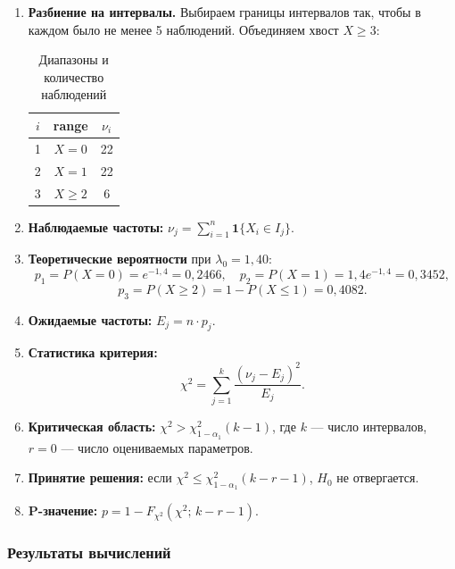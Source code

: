 \documentclass[12pt,a4paper]{article}
\begin{document}
	\begin{enumerate}
		\item \textbf{Разбиение на интервалы.}
		Выбираем границы интервалов так, чтобы в каждом было не менее 5 наблюдений.
		Объединяем хвост $X \ge 3$:
		
		\begin{table}[H]
			\centering
			\begin{tabular}{ccc}
				\toprule
				$i$ & range & $\nu_i$ \\
				\midrule
				1 & $X = 0$   & 22 \\
				2 & $X = 1$   & 22 \\
				3 & $X \ge 2$ &  6 \\
				\bottomrule
			\end{tabular}
			\caption{Диапазоны и количество наблюдений}
		\end{table}
		
		\item \textbf{Наблюдаемые частоты:} $\nu_j = \sum_{i=1}^n \mathbf{1}\{X_i \in I_j\}$.
		
		\item \textbf{Теоретические вероятности} при $\lambda_0 = 1{,}40$:
		\[
		p_1 = P(X=0) = e^{-1{,}4} = 0{,}2466,\quad
		p_2 = P(X=1) = 1{,}4e^{-1{,}4} = 0{,}3452,
		\]
		\[
		p_3 = P(X\ge2) = 1 - P(X\le1) = 0{,}4082.
		\]
		
		\item \textbf{Ожидаемые частоты:} $E_j = n\cdot p_j$.
		
		\item \textbf{Статистика критерия:}
		\[
		\chi^2 = \sum_{j=1}^k \frac{(\nu_j - E_j)^2}{E_j}.
		\]
		
		\item \textbf{Критическая область:} $\chi^2 > \chi^2_{1-\alpha_1}(k-1)$,
		где $k$ --- число интервалов, $r=0$ --- число оцениваемых параметров.
		
		\item \textbf{Принятие решения:} если $\chi^2 \le \chi^2_{1-\alpha_1}(k-r-1)$,
		$H_0$ не отвергается.
		
		\item \textbf{P-значение:} $p = 1 - F_{\chi^2}(\chi^2;\,k-r-1)$.
	\end{enumerate}
	
	\subsubsection*{Результаты вычислений}
	
\end{document}
